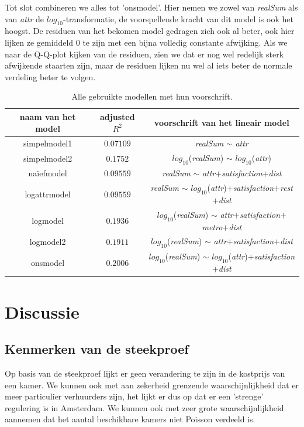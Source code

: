 \documentclass[a4paper]{kulakarticle}
\begin{document}
	Tot slot combineren we alles tot 'onsmodel'. Hier nemen we zowel van \textit{realSum} als van \textit{attr} de $log_{10}$-transformatie, de voorspellende kracht van dit model is ook het hoogst. De residuen van het bekomen model gedragen zich ook al beter, ook hier lijken ze gemiddeld 0 te zijn met een bijna volledig constante afwijking. Als we naar de Q-Q-plot kijken van de residuen, zien we dat er nog wel redelijk sterk afwijkende staarten zijn, maar de residuen lijken nu wel al iets beter de normale verdeling beter te volgen.  

	\begin{table}[h]
		\centering
		\begin{tabular}{c|c|c}
		\centering
		naam van het model & adjusted $R^2$ & voorschrift van het lineair model \\
		\hline
		 simpelmodel1 & $0.07109$ & \textit{realSum} $\sim$ \textit{attr}\\
		 simpelmodel2 &$0.1752$ & $log_{10}$(\textit{realSum}) $\sim$ $log_{10}$(\textit{attr}) \\
		naïefmodel & $0.09559$& \textit{realSum} $\sim$ \textit{attr}$+$\textit{satisfaction}$+$\textit{dist}\\
		 logattrmodel &$0.09559$ & \textit{realSum} $\sim$ $log_{10}$(\textit{attr})$+$\textit{satisfaction}$+$\textit{rest}$+$\textit{dist}\\
		 logmodel &$0.1936$ & $log_{10}$(\textit{realSum}) $\sim$ \textit{attr}$+$\textit{satisfaction}$+$\textit{metro}$+$\textit{dist}\\
		 logmodel2 &$0.1911$ & $log_{10}$(\textit{realSum}) $\sim$ \textit{attr}$+$\textit{satisfaction}$+$\textit{dist}\\
		  onsmodel &$0.2006$ & $log_{10}$(\textit{realSum}) $\sim$ $log_{10}$(\textit{attr})$+$\textit{satisfaction}$+$\textit{dist}\\
		\end{tabular}
		\caption{Alle gebruikte modellen met hun voorschrift.}
		\label{rsq}
	\end{table}
	

	
	\section{Discussie}
	
	\subsection{Kenmerken van de steekproef}
	Op basis van de steekproef lijkt er geen verandering te zijn in de kostprijs van een kamer. We kunnen ook met aan zekerheid grenzende waarschijnlijkheid dat er meer particulier verhuurders zijn, het lijkt er dus op dat er een 'strenge' regulering is in Amsterdam. We kunnen ook met zeer grote waarschijnlijkheid aannemen dat het aantal beschikbare kamers niet Poisson verdeeld is.
	
\end{document}
